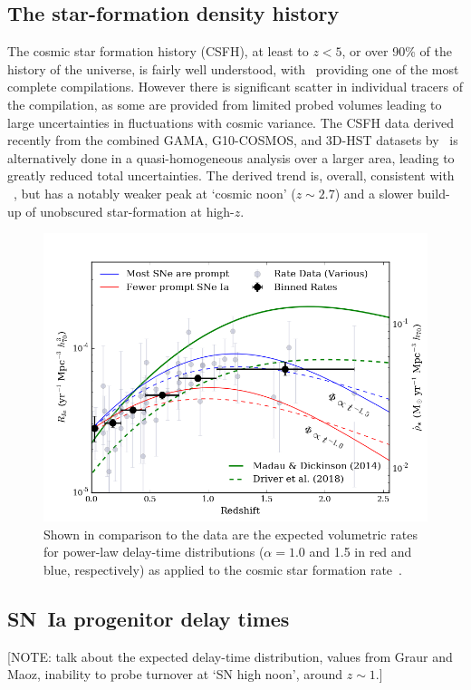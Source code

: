 \documentclass[apj]{aastex}
\begin{document}
\subsection{The star-formation density history}
The cosmic star formation history (CSFH), at least to $z < 5$, or over 90\% of the history of the universe, is fairly well understood, with~\cite{Madau:2014fk} providing one of the most complete compilations. However there is significant scatter in individual tracers of the compilation, as some are provided from limited probed volumes leading to large uncertainties in fluctuations with cosmic variance. The CSFH data derived recently from the combined GAMA, G10-COSMOS, and 3D-HST datasets by~\cite{Driver:2018nr} is alternatively done in a quasi-homogeneous analysis over a larger area, leading to greatly reduced total uncertainties. The derived trend is, overall, consistent with ~\cite{Madau:2014fk}, but has a notably weaker peak at `cosmic noon' ($z\sim2.7$) and a slower build-up of unobscured star-formation at high-$z$.

\begin{figure}[t]
   \centering
   \includegraphics[width=6.1in]{figure_SNIa_rate_alpha}
   \caption{\footnotesize Shown in comparison to the data are the expected volumetric rates for power-law delay-time distributions ($\alpha = 1.0$ and 1.5 in red and blue, respectively) as applied to the cosmic star formation rate~\citep[in green]{Madau:2014fk}.}
   \label{fig:sn1a_rates2}
\end{figure}


\subsection{SN~Ia progenitor delay times}
[NOTE: talk about the expected delay-time distribution, values from Graur and Maoz, inability to probe turnover at `SN high noon', around $z\sim1$.]
\end{document}
